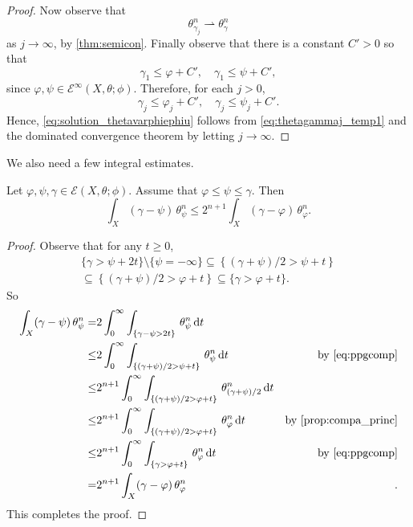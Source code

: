 \begin{proof}
    Now observe that
    \[
    \theta_{\gamma_j}^n\rightharpoonup \theta_{\gamma}^n
    \]
    as $j\to \infty$, by \cref{thm:semicon}.
    Finally observe that there is a constant $C'>0$ so that
    \[
    \gamma_1\leq \varphi+C',\quad \gamma_1\leq \psi+C',
    \]
    since $\varphi,\psi\in \mathcal{E}^{\infty}(X,\theta;\phi)$.
    Therefore, for each $j>0$,
    \[
    \gamma_j\leq \varphi_j+C',\quad \gamma_j\leq \psi_j+C'.
    \]
    Hence, \eqref{eq:solution_thetavarphiephiu} follows from \eqref{eq:thetagammaj_temp1} and the dominated convergence theorem by letting $j\to\infty$.
\end{proof}


We also need a few integral estimates.


\begin{lemma}\label{lma:fundam_estimate}
	Let $\varphi,\psi,\gamma\in \mathcal{E}(X,\theta;\phi)$. Assume that $\varphi\leq \psi\leq \gamma$. Then
	\[
	\int_X (\gamma-\psi)\,\theta_{\psi}^n\leq 2^{n+1}\int_X (\gamma-\varphi)\,\theta_{\varphi}^n.
	\]
\end{lemma}
\begin{proof}
	Observe that for any $t\geq 0$,
	\begin{equation}\label{eq:ppgcomp}
        \begin{split}
		\{\gamma>\psi+2t\}\setminus \{\psi=-\infty\}\subseteq \left\{(\gamma+\psi)/2>\psi+t\right\}\\
        \subseteq \left\{(\gamma+\psi)/2>\varphi+t\right\}\subseteq \{\gamma>\varphi+t\}.
        \end{split}
	\end{equation}
	So
	\[
	\begin{aligned}
		\int_X (\gamma-\psi)\,\theta_{\psi}^n
		=& 2\int_0^{\infty}  \int_{\{\gamma-\psi>2t\}}\,\theta_{\psi}^n\,\mathrm{d}t &\\
		\leq & 2\int_0^{\infty} \int_{\left\{(\gamma+\psi)/2>\psi+t\right\}}\,\theta_{\psi}^n\,\mathrm{d}t & \textup{by \eqref{eq:ppgcomp}}\\
		\leq  & 2^{n+1}\int_0^{\infty} \int_{\left\{(\gamma+\psi)/2>\varphi+t\right\}}\,\theta_{(\gamma+\psi)/2}^n\,\mathrm{d}t &\\
		\leq & 2^{n+1}\int_0^{\infty} \int_{\left\{(\gamma+\psi)/2>\varphi+t\right\}}\,\theta_{\varphi}^n\,\mathrm{d}t & \textup{by \cref{prop:compa_princ}}\\
		\leq &2^{n+1}\int_0^{\infty} \int_{\left\{\gamma>\varphi+t\right\}}\,\theta_{\varphi}^n\,\mathrm{d}t &\textup{by \eqref{eq:ppgcomp}}\\
		=& 2^{n+1} \int_X (\gamma-\varphi)\,\theta_{\varphi}^n &.
	\end{aligned}
	\]
	This completes the proof.
\end{proof}

